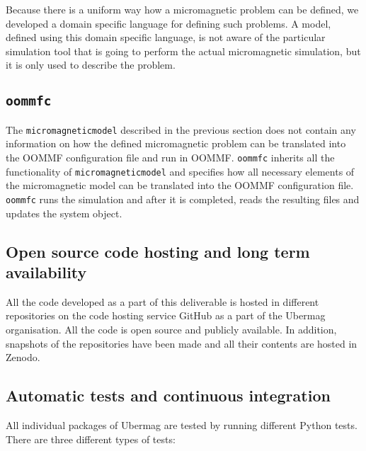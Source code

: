\documentclass{deliverablereport}
\begin{document}
Because there is a uniform way how a micromagnetic problem can be
defined, we developed a domain specific language for defining such
problems. A model, defined using this domain specific language, is not
aware of the particular simulation tool that is going to perform the
actual micromagnetic simulation, but it is only used to describe the
problem.

\subsection{\texttt{oommfc}}\label{sec:oommfc}

The \texttt{micromagneticmodel} described in the previous section does not
contain any information on how the defined micromagnetic problem can
be translated into the OOMMF configuration file and run in
OOMMF. \texttt{oommfc} inherits all the functionality of
\texttt{micromagneticmodel} and specifies how all necessary elements
of the micromagnetic model can be translated into the OOMMF
configuration file. \texttt{oommfc} runs the simulation and after it
is completed, reads the resulting files and updates the system object.

\subsection{Open source code hosting and long term availability}

All the code developed as a part of this deliverable is hosted in
different repositories on the code hosting service GitHub as a part of
the Ubermag organisation. All the code is open source and publicly
available. In addition, snapshots of the repositories have been made
and all their contents are hosted in Zenodo.

\subsection{Automatic tests and continuous integration}

All individual packages of Ubermag are tested by running different
Python tests. There are three different types of tests:
\end{document}
